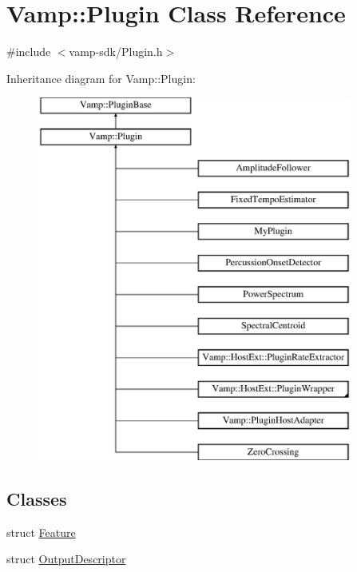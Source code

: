 \hypertarget{class_vamp_1_1_plugin}{}\section{Vamp\+:\+:Plugin Class Reference}
\label{class_vamp_1_1_plugin}


{\ttfamily \#include $<$vamp-\/sdk/\+Plugin.\+h$>$}

Inheritance diagram for Vamp\+:\+:Plugin\+:\begin{figure}[H]
\begin{center}
\leavevmode
\includegraphics[height=12.000000cm]{class_vamp_1_1_plugin}
\end{center}
\end{figure}
\subsection*{Classes}
\begin{DoxyCompactItemize}
\item 
struct \hyperlink{struct_vamp_1_1_plugin_1_1_feature}{Feature}
\item 
struct \hyperlink{struct_vamp_1_1_plugin_1_1_output_descriptor}{Output\+Descriptor}
\end{DoxyCompactItemize}
